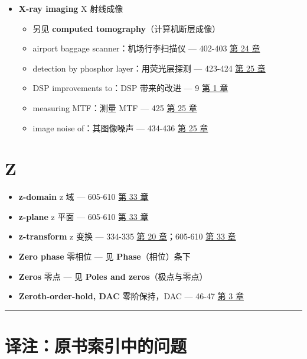 \begin{itemize}
\tightlist
\item
  \textbf{X-ray imaging} X 射线成像

  \begin{itemize}
  \tightlist
  \item
    另见 \textbf{computed tomography}（计算机断层成像）
  \item
    airport baggage scanner：机场行李扫描仪 --- 402-403 
    \hyperref[ch-24]{第 24 章}
  \item
    detection by phosphor layer：用荧光层探测 --- 423-424 
    \hyperref[ch-25]{第 25 章}
  \item
    DSP improvements to：DSP 带来的改进 --- 9 
    \hyperref[ch-01]{第 1 章}
  \item
    measuring MTF：测量 MTF --- 425  \hyperref[ch-25]{第 25
    章}
  \item
    image noise of：其图像噪声 --- 434-436 
    \hyperref[ch-25]{第 25 章}
  \end{itemize}
\end{itemize}

\section{Z}

\begin{itemize}
\tightlist
\item
  \textbf{z-domain} z 域 --- 605-610  \hyperref[ch-33]{第 33
  章}
\item
  \textbf{z-plane} z 平面 --- 605-610  \hyperref[ch-33]{第 33
  章}
\item
  \textbf{z-transform} z 变换 --- 334-335  \hyperref[ch-20]{第
  20 章}；605-610  \hyperref[ch-33]{第 33 章}
\item
  \textbf{Zero phase} 零相位 --- 见 \textbf{Phase}（相位）条下
\item
  \textbf{Zeros} 零点 --- 见 \textbf{Poles and zeros}（极点与零点）
\item
  \textbf{Zeroth-order-hold, DAC} 零阶保持，DAC --- 46-47 
  \hyperref[ch-03]{第 3 章}
\end{itemize}

\begin{center}\rule{0.5\linewidth}{0.5pt}\end{center}

\section{译注：原书索引中的问题}

